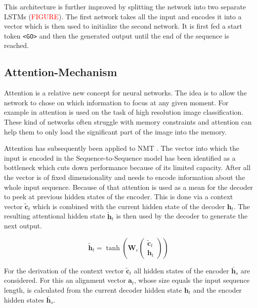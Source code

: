 This architecture is further improved by splitting the network into two separate LSTMs (\textcolor{red}{FIGURE}). The first network takes all the input and encodes it into a vector which is then used to initialize the second network. It is first fed a start token \texttt{<GO>} and then the generated output until the end of the sequence is reached.

\subsection{Attention-Mechanism}

Attention is a relative new concept for neural networks. The idea is to allow the network to chose on which information to focus at any given moment. For example in \cite{visual_attention} attention is used on the task of high resolution image classification. These kind of networks often struggle with memory constraints and attention can help them to only load the significant part of the image into the memory.

Attention has subsequently been applied to NMT \cite{attention_luong,attention_bahdanau}. The vector into which the input is encoded in the Sequence-to-Sequence model has been identified as a bottleneck which cuts down performance because of its limited capacity. After all the vector is of fixed dimensionality and needs to encode information about the whole input sequence. Because of that attention is used as a mean for the decoder to peek at previous hidden states of the encoder. This is done via a context vector \(\tilde{\mathbf{c}}_t\) which is combined with the current hidden state of the decoder \(\mathbf{h}_t\). The resulting attentional hidden state \(\tilde{\mathbf{h}}_t\) is then used by the decoder to generate the next output.

\begin{equation*}
  \tilde{\mathbf{h}}_t = \tanh \left(\mathbf{W}_c \begin{pmatrix} \tilde{\mathbf{c}}_t \\ \mathbf{h}_{t} \end{pmatrix} \right)
\end{equation*}

For the derivation of the context vector \(\tilde{\mathbf{c}}_t\) all hidden states of the encoder \(\bar{\mathbf{h}}_s\) are considered. For this an alignment vector \(\mathbf{a}_t\), whose size equals the input sequence length, is calculated from the current decoder hidden state \(\mathbf{h}_t\) and the encoder hidden states \(\bar{\mathbf{h}}_s\).

